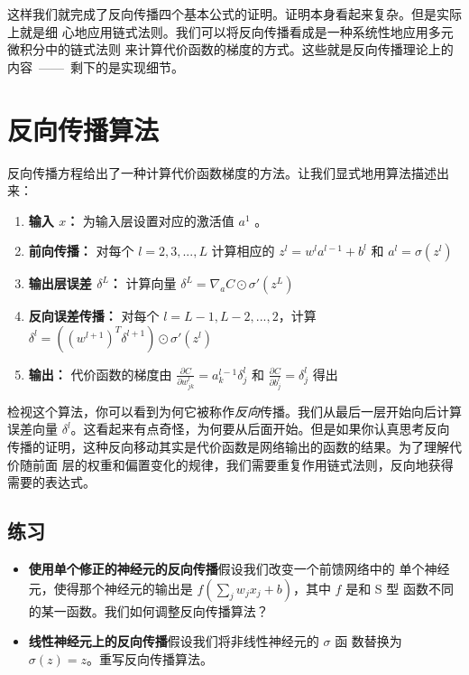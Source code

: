 这样我们就完成了反向传播四个基本公式的证明。证明本身看起来复杂。但是实际上就是细
心地应用链式法则。我们可以将反向传播看成是一种系统性地应用多元微积分中的链式法则
来计算代价函数的梯度的方式。这些就是反向传播理论上的内容~——~剩下的是实现细节。

\section{反向传播算法}
\label{sec:the_backpropagation_algorithm}

反向传播方程给出了一种计算代价函数梯度的方法。让我们显式地用算法描述出来：

\begin{enumerate}
\item \textbf{输入 $x$：} 为输入层设置对应的激活值 $a^{1}$ 。
\item \textbf{前向传播：} 对每个 $l=2,3,...,L$ 计算相应的 $z^l = w^la^{l-1} +
  b^l$ 和 $a^l = \sigma(z^l)$
\item \textbf{输出层误差 $\delta^L$：} 计算向量 $\delta^L = \nabla_a C \odot
  \sigma'(z^L)$
\item \textbf{反向误差传播：} 对每个 $l=L-1, L-2,...,2$，计算
  $\delta^l = ((w^{l+1})^T\delta^{l+1})\odot \sigma'(z^l)$
\item \textbf{输出：} 代价函数的梯度由 $\frac{\partial C}{\partial w^l_{jk}} = a^{l-1}_k \delta^l_j$ 和 $\frac{\partial C}{\partial b_j^l} = \delta_j^l$ 得出
\end{enumerate}

检视这个算法，你可以看到为何它被称作\emph{反向}传播。我们从最后一层开始向后计算
误差向量 $\delta^l$。这看起来有点奇怪，为何要从后面开始。但是如果你认真思考反向
传播的证明，这种反向移动其实是代价函数是网络输出的函数的结果。为了理解代价随前面
层的权重和偏置变化的规律，我们需要重复作用链式法则，反向地获得需要的表达式。

\subsection*{练习}

\begin{itemize}
\item \textbf{使用单个修正的神经元的反向传播}\quad 假设我们改变一个前馈网络中的
  单个神经元，使得那个神经元的输出是 $f(\sum_j w_jx_j + b)$，其中 $f$ 是和 S 型
  函数不同的某一函数。我们如何调整反向传播算法？
\item \textbf{线性神经元上的反向传播}\quad 假设我们将非线性神经元的 $\sigma$ 函
  数替换为 $\sigma(z) = z$。重写反向传播算法。
\end{itemize}

